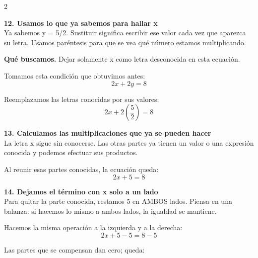 \documentclass[11pt,a4paper,landscape]{article}
\begin{document}
\begin{multicols*}{2}
\begin{minipage}{\linewidth}
\end{minipage}\par\medskip
\noindent\begin{minipage}{\linewidth}\textbf{12. Usamos lo que ya sabemos para hallar x}\\[2pt]Ya sabemos y = 5/2. Sustituir significa escribir ese valor cada vez que aparezca su letra. Usamos paréntesis para que se vea qué número estamos multiplicando.
\par\smallskip\textbf{Qué buscamos.} Dejar solamente x como letra desconocida en esta ecuación.
\par\smallskip Tomamos esta condición que obtuvimos antes:
\[2x + 2y = 8\]
\par\smallskip Reemplazamos las letras conocidas por sus valores:
\[2x + 2\left(\frac{5}{2}\right)=8\]
\end{minipage}\par\medskip
\noindent\begin{minipage}{\linewidth}\textbf{13. Calculamos las multiplicaciones que ya se pueden hacer}\\[2pt]La letra x sigue sin conocerse. Las otras partes ya tienen un valor o una expresión conocida y podemos efectuar sus productos.
\par{}\par\smallskip
\par\smallskip Al reunir esas partes conocidas, la ecuación queda:
\[2x + 5=8\]
\end{minipage}\par\medskip
\noindent\begin{minipage}{\linewidth}\textbf{14. Dejamos el término con x solo a un lado}\\[2pt]Para quitar la parte conocida, restamos 5 en AMBOS lados. Piensa en una balanza: si hacemos lo mismo a ambos lados, la igualdad se mantiene.
\par\smallskip Hacemos la misma operación a la izquierda y a la derecha:
\[2x + 5 - 5=8 - 5\]
\par\smallskip Las partes que se compensan dan cero; queda:

\end{minipage}
\end{multicols*}
\end{document}
